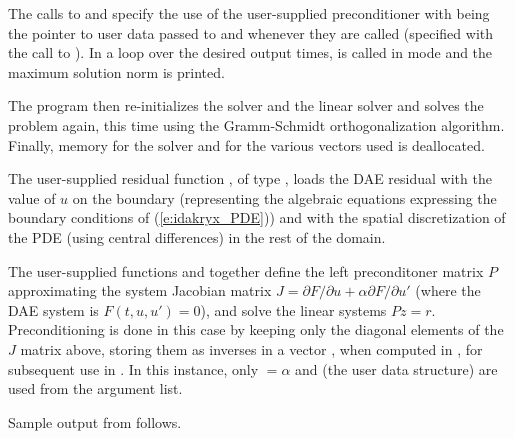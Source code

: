 The calls to  and 
specify the use of the user-supplied preconditioner with 
being the pointer to user data passed to  and  
whenever they are called (specified with the call to ).
In a loop over the desired output times,  is called in 
mode and the maximum solution norm is printed.

The  program then re-initializes the {\ida} solver and the
{\idaspgmr} linear solver and solves the problem again, this time
using the  Gramm-Schmidt orthogonalization algorithm.
Finally, memory for the {\ida} solver and for the various vectors used is deallocated.

The user-supplied residual function , of type ,
loads the DAE residual with the value of $u$ on the boundary
(representing the algebraic equations expressing the boundary
conditions of (\ref{e:idakryx_PDE})) and with the spatial discretization 
of the PDE (using central differences) in the rest of the domain.

The user-supplied functions  and  together define the 
left preconditoner matrix $P$ approximating the system Jacobian matrix
$J = \partial F/ \partial u + \alpha \partial F/ \partial u'$ (where the DAE
system is $F(t,u,u') = 0$), and solve the linear systems $P z = r$.   
Preconditioning  is done in this case by keeping only the diagonal elements of 
the $J$ matrix above, storing them as inverses in a vector , when computed
in , for subsequent use in .
In this instance, only  $=\alpha$ and  (the user data
structure) are used from the  argument list.

Sample output from  follows.
